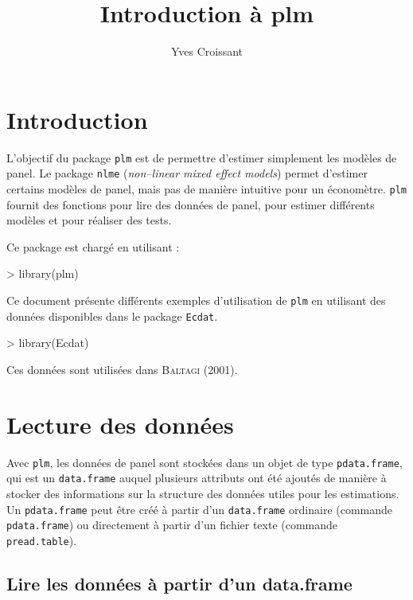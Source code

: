 \documentclass[a4paper]{article}
\title{Introduction à plm}
\author{Yves Croissant}
\begin{document}
\maketitle


\section{Introduction}

L'objectif du package \texttt{plm} est de permettre d'estimer
simplement les modèles de panel. Le package \texttt{nlme}
(\textit{non--linear mixed effect models}) permet
d'estimer certains modèles de panel, mais pas de manière intuitive
pour un économètre. \texttt{plm} fournit des fonctions pour lire
des données de panel, pour estimer différents modèles et pour
réaliser des tests.

Ce package est chargé en utilisant :

\begin{Schunk}
\begin{Sinput}
> library(plm)
\end{Sinput}
\end{Schunk}


Ce document présente différents exemples d'utilisation de \texttt{plm}
en utilisant des données disponibles dans le package
\texttt{Ecdat}. 

\begin{Schunk}
\begin{Sinput}
> library(Ecdat)
\end{Sinput}
\end{Schunk}

Ces données sont utilisées dans \textsc{Baltagi} (2001).

\section{Lecture des données}

Avec \texttt{plm}, les données de panel sont stockées dans un objet de
type \texttt{pdata.frame}, qui est un \texttt{data.frame} auquel
plusieurs attributs ont été ajoutés de manière à stocker des
informations sur la structure des données utiles pour les
estimations. Un \texttt{pdata.frame} peut être créé à partir d'un
\texttt{data.frame} ordinaire (commande \texttt{pdata.frame}) ou
directement à partir d'un fichier texte (commande
\texttt{pread.table}). 


\subsection{Lire les données à partir d'un data.frame}
\end{document}
